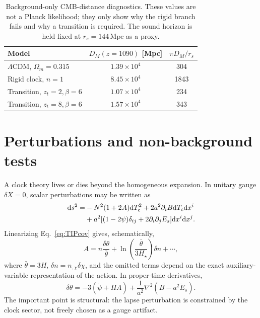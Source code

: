 \documentclass[aps,prd,reprint,nofootinbib,superscriptaddress,longbibliography]{revtex4-2}
\newcommand{\dd}{\mathrm{d}}
\newcommand{\Tc}{T_{\rm c}}
\newcommand{\Mpc}{\,\mathrm{Mpc}}
\begin{document}
\begin{table}[t]
\caption{Background-only CMB-distance diagnostics.  These values are not a Planck likelihood; they only show why the rigid branch fails and why a transition is required.  The sound horizon is held fixed at $r_s=144\Mpc$ as a proxy.}
\label{tab:cmbproxy}
\begin{ruledtabular}
\begin{tabular}{lcc}
Model & $D_M(z=1090)$ [Mpc] & $\pi D_M/r_s$ \\
\hline
$\Lambda$CDM, $\Omega_m=0.315$ & $1.39\times10^4$ & 304 \\
Rigid clock, $n=1$ & $8.45\times10^4$ & 1843 \\
Transition, $z_t=2,\beta=6$ & $1.07\times10^4$ & 234 \\
Transition, $z_t=8,\beta=6$ & $1.57\times10^4$ & 343 \\
\end{tabular}
\end{ruledtabular}
\end{table}

\section{Perturbations and non-background tests}

A clock theory lives or dies beyond the homogeneous expansion.  In unitary gauge $\delta X=0$, scalar perturbations may be written as
\begin{equation}
\begin{split}
  \dd s^2=&-N^2(1+2A)\dd\Tc^2+2a^2\partial_iB\dd\Tc\dd x^i \\
  &+a^2[(1-2\psi)\delta_{ij}+2\partial_i\partial_jE_s]\dd x^i\dd x^j .
\end{split}
\end{equation}
Linearizing Eq.~\eqref{eq:TIPcov} gives, schematically,
\begin{equation}
  A=n\frac{\delta\theta}{\bar\theta}
  +\ln\left(\frac{\bar\theta}{3H_\star}\right)\delta n+\cdots,
  \label{eq:pertconstraint}
\end{equation}
where $\bar\theta=3H$, $\delta n=n_{,\chi}\delta\chi$, and the omitted terms depend on the exact auxiliary-variable representation of the action.  In proper-time derivatives,
\begin{equation}
  \delta\theta=-3(\dot\psi+HA)+\frac{1}{a^2}\nabla^2(B-a^2\dot E_s).
\end{equation}
The important point is structural: the lapse perturbation is constrained by the clock sector, not freely chosen as a gauge artifact.
\end{document}
